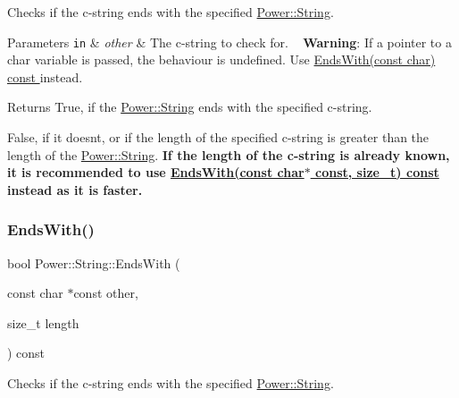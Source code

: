 Checks if the c-\/string ends with the specified \hyperlink{class_power_1_1_string}{Power\+::\+String}. 


\begin{DoxyParams}[1]{Parameters}
\mbox{\tt in}  & {\em other} & The c-\/string to check for. ~\newline
 {\bfseries Warning}\+: If a pointer to a char variable is passed, the behaviour is undefined. Use \hyperlink{class_power_1_1_string_a8f4b32bad7099116f14259d2bd0c4004}{Ends\+With(const char) const }instead. \\
\hline
\end{DoxyParams}
\begin{DoxyReturn}{Returns}
True, if the \hyperlink{class_power_1_1_string}{Power\+::\+String} ends with the specified c-\/string. 

False, if it doesn\textquotesingle{}t, or if the length of the specified c-\/string is greater than the length of the \hyperlink{class_power_1_1_string}{Power\+::\+String}.  {\bfseries If the length of the c-\/string is already known, it is recommended to use \hyperlink{class_power_1_1_string_a7e5527a7258c8e83f19cc5a353a203b9}{Ends\+With(const char$\ast$ const, size\+\_\+t) const }instead as it is faster.} 
\end{DoxyReturn}
\mbox{\label{class_power_1_1_string_a7e5527a7258c8e83f19cc5a353a203b9}} 
\subsubsection{\texorpdfstring{Ends\+With()}{EndsWith()}\hspace{0.1cm}{\footnotesize\ttfamily [3/4]}}
{\footnotesize\ttfamily bool Power\+::\+String\+::\+Ends\+With (\begin{DoxyParamCaption}\item[{const char $\ast$const}]{other,  }\item[{size\+\_\+t}]{length }\end{DoxyParamCaption}) const\hspace{0.3cm}{\ttfamily [inline]}}



Checks if the c-\/string ends with the specified \hyperlink{class_power_1_1_string}{Power\+::\+String}. 


